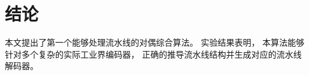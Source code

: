 %
%
%

\section{结论}\label{sec_conclude_chap4}

本文提出了第一个能够处理流水线的对偶综合算法。
实验结果表明，
本算法能够针对多个复杂的实际工业界编码器，
正确的推导流水线结构并生成对应的流水线解码器。
